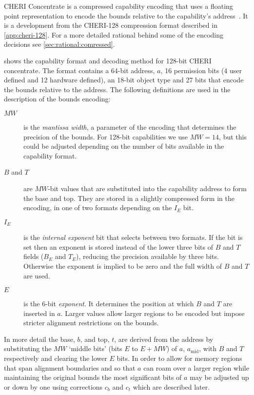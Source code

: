 CHERI Concentrate is a compressed capability encoding that uses a floating point
representation to encode the bounds relative to the capability's address~\cite{Woodruff2019}.
It is a development from the CHERI-128 compression format described in \cref{app:cheri-128}.
For a more detailed rational behind some of the encoding decisions see \cref{sec:rational:comressed}.

 shows the capability format and decoding method for 128-bit CHERI concentrate.
The format contains a 64-bit address, $a$, 16 permission bits (4 user defined and 12 hardware defined), an 18-bit object type and 27 bits that encode the bounds relative to the address.
The following definitions are used in the description of the bounds encoding:

\begin{description}

\item[$MW$] is the \emph{mantissa width}, a parameter of the encoding that
  determines the precision of the bounds. For 128-bit capabilities we
  use $MW = 14$, but this could be adjusted depending on
  the number of bits available in the capability format.

\item[$B$ and $T$] are $MW$-bit values that are substituted into the
  capability address to form the base and top. They are stored in a
  slightly compressed form in the encoding, in one of two formats
  depending on the $I_E$ bit.

\item[$I_E$] is the \emph{internal exponent} bit that selects between
  two formats. If the bit is set then an exponent is stored instead of
  the lower three bits of $B$ and $T$ fields ($B_E$ and $T_E$),
  reducing the precision available by three bits. Otherwise the
  exponent is implied to be zero and the full width of $B$ and $T$ are
  used.

\item[$E$] is the 6-bit \emph{exponent}. It determines the position at which
  $B$ and $T$ are inserted in $a$. Larger values allow larger regions
  to be encoded but impose stricter alignment restrictions on the
  bounds.

\end{description}

In more detail the base, $b$, and top, $t$, are derived from the
address by substituting the $MW$ `middle bits' (bits $E$ to $E + MW$)
of $a$, $a_\text{mid}$, with $B$ and $T$ respectively and clearing the
lower $E$ bits.  In order to allow for memory regions that span
alignment boundaries and so that $a$ can roam over a larger region
while maintaining the original bounds the most significant bits of
$a$ may be adjusted up or down by one using
corrections $c_b$ and $c_t$ which are described later.

